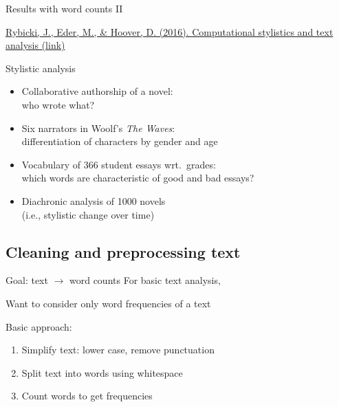 \documentclass[aspectratio=169,usenames,dvipsnames]{beamer}
\begin{document}
\begin{frame}{Results with word counts II}
    \begin{reference}
        \href{http://www.infotext.unisi.it/upload/rybickihoovereder_with_figures.pdf}{Rybicki, J., Eder, M., \& Hoover, D. (2016). Computational stylistics and text analysis (link)}
    \end{reference}
    Stylistic analysis
    \begin{itemize}
    \item Collaborative authorship of a novel: \\
        who wrote what?
    \item Six narrators in Woolf's \emph{The Waves}: \\
        differentiation of characters by gender and age
    \item Vocabulary of 366 student essays wrt.\ grades: \\
        which words are characteristic of good and bad essays?
    \item Diachronic analysis of 1000 novels \\
        (i.e., stylistic change over time)
    \end{itemize}
\end{frame}


\subsection{Cleaning and preprocessing text}
\frame{\tableofcontents[currentsubsection]}

\begin{frame}{Goal: text $\rightarrow$ word counts}
    For basic text analysis,

    Want to consider only word frequencies of a text

    \vspace{1em}
    Basic approach:
    \begin{enumerate}
        \item Simplify text: lower case, remove punctuation
        \item Split text into words using whitespace
        \item Count words to get frequencies
    \end{enumerate}
\end{frame}
\end{document}
